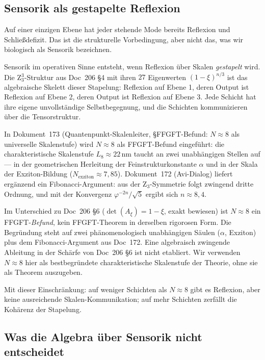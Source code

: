 \subsection{Sensorik als gestapelte Reflexion}\label{sec:reflexion_stapel}

Auf einer einzigen Ebene hat jeder stehende Mode bereits Reflexion und Schließdefizit. Das ist die strukturelle Vorbedingung, aber nicht das, was wir biologisch als Sensorik bezeichnen.

Sensorik im operativen Sinne entsteht, wenn Reflexion über Skalen \emph{gestapelt} wird. Die Z$_3^3$-Struktur aus Doc~206 \S4 mit ihren $27$ Eigenwerten $(1-\xi)^{n/3}$ ist das algebraische Skelett dieser Stapelung: Reflexion auf Ebene 1, deren Output ist Reflexion auf Ebene 2, deren Output ist Reflexion auf Ebene 3. Jede Schicht hat ihre eigene unvollständige Selbstbegegnung, und die Schichten kommunizieren über die Tensorstruktur.

In Dokument~173 (Quantenpunkt-Skalenleiter, \S\glqq FFGFT-Befund: $N \approx 8$ als universelle Skalenstufe\grqq) wird $N \approx 8$ als FFGFT-Befund eingeführt: die charakteristische Skalenstufe $L_8 \approx 22$\,nm taucht an zwei unabhängigen Stellen auf --- in der geometrischen Herleitung der Feinstrukturkonstante $\alpha$ und in der Skala der Exziton-Bildung ($N_{\text{exziton}} \approx 7{,}85$). Dokument~172 (Avi-Dialog) liefert ergänzend ein Fibonacci-Argument: aus der Z$_3$-Symmetrie folgt zwingend dritte Ordnung, und mit der Konvergenz $\varphi^{-2n}/\sqrt{5}$ ergibt sich $n \approx 8{,}4$.

\begin{important}
Im Unterschied zu Doc~206 \S6 ($\det(A_\xi) = 1-\xi$, exakt bewiesen) ist $N \approx 8$ ein FFGFT-\emph{Befund}, kein FFGFT-Theorem in derselben rigorosen Form. Die Begründung steht auf zwei phänomenologisch unabhängigen Säulen ($\alpha$, Exziton) plus dem Fibonacci-Argument aus Doc~172. Eine algebraisch zwingende Ableitung in der Schärfe von Doc~206 \S6 ist nicht etabliert. Wir verwenden $N \approx 8$ hier als bestbegründete charakteristische Skalenstufe der Theorie, ohne sie als Theorem auszugeben.
\end{important}

Mit dieser Einschränkung: auf weniger Schichten als $N \approx 8$ gibt es Reflexion, aber keine ausreichende Skalen-Kommunikation; auf mehr Schichten zerfällt die Kohärenz der Stapelung.

\subsection{Was die Algebra über Sensorik nicht entscheidet}\label{sec:reflexion_grenze}

